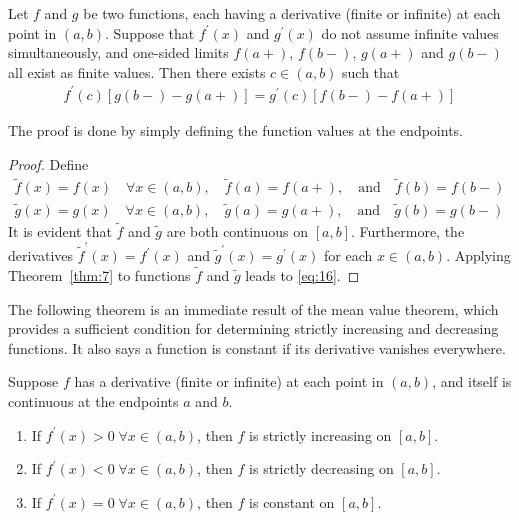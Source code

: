\documentclass[thmcnt=section, 12pt]{my-elegantbook}
\begin{document}
\begin{theorem}
    Let $f$ and $g$ be two functions, each having a derivative (finite or infinite) at each point in $(a, b)$. Suppose that $f^\prime(x)$ and $g^\prime(x)$ do not assume infinite values simultaneously, and one-sided limits $f(a+)$, $f(b-)$, $g(a+)$ and $g(b-)$ all exist as finite values. Then there exists $c \in (a, b)$ such that 
    \begin{align}
        f^\prime(c) [g(b-) - g(a+)]
        = g^\prime(c) [f(b-) - f(a+)]
        \label{eq:16}
    \end{align} 
\end{theorem}

\par The proof is done by simply defining the function values at the endpoints.

\begin{proof}
    Define
    \begin{align*}
        \tilde{f}(x) = f(x) \quad \forall x \in (a, b),
        \quad
        \tilde{f}(a) = f(a+),
        \quad \text{and} \quad
        \tilde{f}(b) = f(b-) \\ 
        \tilde{g}(x) = g(x) \quad \forall x \in (a, b),
        \quad
        \tilde{g}(a) = g(a+),
        \quad \text{and} \quad
        \tilde{g}(b) = g(b-)
    \end{align*}
    It is evident that $\tilde{f}$ and $\tilde{g}$ are both continuous on $[a, b]$. Furthermore, the derivatives $\tilde{f}^\prime(x) = f^\prime(x)$ and $\tilde{g}^\prime(x) = g^\prime(x)$ for each $x \in (a, b)$. Applying Theorem~\ref{thm:7} to functions $\tilde{f}$ and $\tilde{g}$ leads to \eqref{eq:16}.
\end{proof}

\par The following theorem is an immediate result of the mean value theorem, which provides a sufficient condition for determining strictly increasing and decreasing functions. It also says a function is constant if its derivative vanishes everywhere.

\begin{theorem} \label{thm:10}
    Suppose $f$ has a derivative (finite or infinite) at each point in $(a, b)$, and itself is continuous at the endpoints $a$ and $b$.
    \begin{enumerate}
        \item If $f^\prime(x) > 0 \; \forall x \in (a, b)$, then $f$ is strictly increasing on $[a, b]$.
        \item If $f^\prime(x) < 0 \; \forall x \in (a, b)$, then $f$ is strictly decreasing on $[a, b]$.
        \item If $f^\prime(x) = 0 \; \forall x \in (a, b)$, then $f$ is constant on $[a, b]$.
    \end{enumerate}
\end{theorem}
\end{document}
